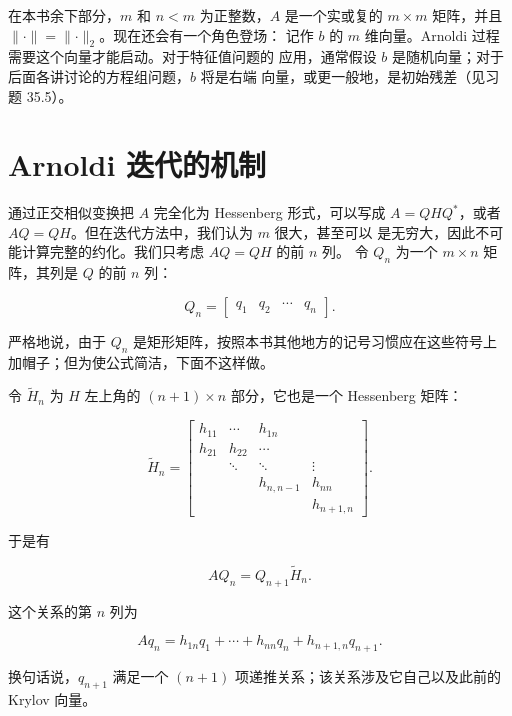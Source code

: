\documentclass[UTF8,fontset=none,12pt]{ctexart}
\begin{document}
在本书余下部分，$m$ 和 $n<m$ 为正整数，$A$ 是一个实或复的 $m\times m$
矩阵，并且 $\lVert\cdot\rVert=\lVert\cdot\rVert_2$。现在还会有一个角色登场：
记作 $b$ 的 $m$ 维向量。Arnoldi 过程需要这个向量才能启动。对于特征值问题的
应用，通常假设 $b$ 是随机向量；对于后面各讲讨论的方程组问题，$b$ 将是右端
向量，或更一般地，是初始残差（见习题 35.5）。

\section*{Arnoldi 迭代的机制}

通过正交相似变换把 $A$ 完全化为 Hessenberg 形式，可以写成
$A=QHQ^*$，或者 $AQ=QH$。但在迭代方法中，我们认为 $m$ 很大，甚至可以
是无穷大，因此不可能计算完整的约化。我们只考虑 $AQ=QH$ 的前 $n$ 列。
令 $Q_n$ 为一个 $m\times n$ 矩阵，其列是 $Q$ 的前 $n$ 列：

\begin{equation}
Q_n=\begin{bmatrix}q_1&q_2&\cdots&q_n\end{bmatrix}.
\tag{33.1}
\end{equation}

严格地说，由于 $Q_n$ 是矩形矩阵，按照本书其他地方的记号习惯应在这些符号上
加帽子；但为使公式简洁，下面不这样做。

令 $\widetilde H_n$ 为 $H$ 左上角的 $(n+1)\times n$ 部分，它也是一个
Hessenberg 矩阵：

\begin{equation}
\widetilde H_n=
\begin{bmatrix}
h_{11}&\cdots&h_{1n}\\
h_{21}&h_{22}&\cdots\\
&\ddots&\ddots&\vdots\\
&&h_{n,n-1}&h_{nn}\\
&&&h_{n+1,n}
\end{bmatrix}.
\tag{33.2}
\end{equation}

于是有

\begin{equation}
AQ_n=Q_{n+1}\widetilde H_n.
\tag{33.3}
\end{equation}

这个关系的第 $n$ 列为

\begin{equation}
Aq_n=h_{1n}q_1+\cdots+h_{nn}q_n+h_{n+1,n}q_{n+1}.
\tag{33.4}
\end{equation}

换句话说，$q_{n+1}$ 满足一个 $(n+1)$ 项递推关系；该关系涉及它自己以及此前的
Krylov 向量。
\end{document}
